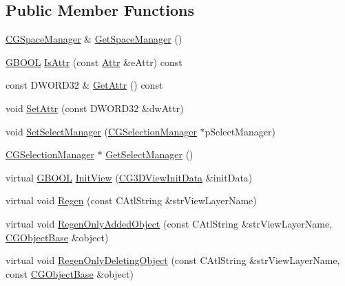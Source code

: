 \subsection*{Public Member Functions}
\begin{DoxyCompactItemize}
\item 
\hyperlink{class_c_g_space_manager}{C\+G\+Space\+Manager} \& \hyperlink{class_c_g3_d_space_view_a8a3f64750952ecc6b120eb4272f0c68b}{Get\+Space\+Manager} ()
\item 
\hyperlink{_g_types_8h_a2901915743626352a6820c5405f556dc}{G\+B\+O\+O\+L} \hyperlink{class_c_g3_d_space_view_a515fde24d4036a93c09c5e9de590f638}{Is\+Attr} (const \hyperlink{class_c_g3_d_space_view_a41938b01269706c0aa66a46634d379b0}{Attr} \&e\+Attr) const 
\item 
const D\+W\+O\+R\+D32 \& \hyperlink{class_c_g3_d_space_view_ab5ddfadff524dc7a36385f3f807f88ea}{Get\+Attr} () const 
\item 
void \hyperlink{class_c_g3_d_space_view_ad0358b2aab30055dfa168ce1cfa74e67}{Set\+Attr} (const D\+W\+O\+R\+D32 \&dw\+Attr)
\item 
void \hyperlink{class_c_g3_d_space_view_af1072de04a87854e12b9a4ab6e3ad60e}{Set\+Select\+Manager} (\hyperlink{class_c_g_selection_manager}{C\+G\+Selection\+Manager} $\ast$p\+Select\+Manager)
\item 
\hyperlink{class_c_g_selection_manager}{C\+G\+Selection\+Manager} $\ast$ \hyperlink{class_c_g3_d_space_view_a187cc6a255fcc931963a1a2a787165ab}{Get\+Select\+Manager} ()
\item 
virtual \hyperlink{_g_types_8h_a2901915743626352a6820c5405f556dc}{G\+B\+O\+O\+L} \hyperlink{class_c_g3_d_space_view_a1eee8f626fad416899cb8bafcc846a4b}{Init\+View} (\hyperlink{class_c_g3_d_view_init_data}{C\+G3\+D\+View\+Init\+Data} \&init\+Data)
\item 
virtual void \hyperlink{class_c_g3_d_space_view_aa82b9ba26d5f68761c6a9e0c7d451126}{Regen} (const C\+Atl\+String \&str\+View\+Layer\+Name)
\item 
virtual void \hyperlink{class_c_g3_d_space_view_a9db364dfec0d9a4fe07fac150e9cb56f}{Regen\+Only\+Added\+Object} (const C\+Atl\+String \&str\+View\+Layer\+Name, \hyperlink{class_c_g_object_base}{C\+G\+Object\+Base} \&object)
\item 
virtual void \hyperlink{class_c_g3_d_space_view_acea820f287c70ae6f0c1b112ce571ac8}{Regen\+Only\+Deleting\+Object} (const C\+Atl\+String \&str\+View\+Layer\+Name, const \hyperlink{class_c_g_object_base}{C\+G\+Object\+Base} \&object)
\item 

\end{DoxyCompactItemize}
